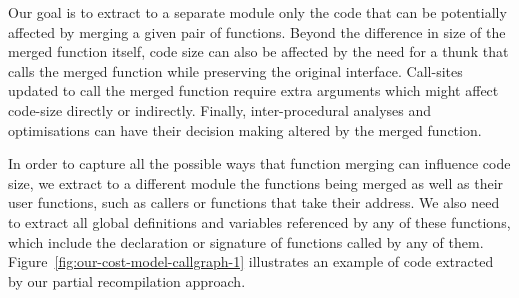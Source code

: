 Our goal is to extract to a separate module only the code that can be potentially affected by merging a given pair of functions.
Beyond the difference in size of the merged function itself, code size can also be affected by the need for a thunk that calls the merged function while preserving the original interface.
Call-sites updated to call the merged function require extra arguments which might affect code-size directly or indirectly. %
Finally, inter-procedural analyses and optimisations can have their decision making altered by the merged function.

In order to capture all the possible ways that function merging can influence code size, we extract to a different module the functions being merged as well as their user functions, such as callers or functions that take their address.
We also need to extract all global definitions and variables referenced by any of these functions, which include the declaration or signature of functions called by any of them.
Figure~\ref{fig:our-cost-model-callgraph-1} illustrates an example of code extracted by our partial recompilation approach.

